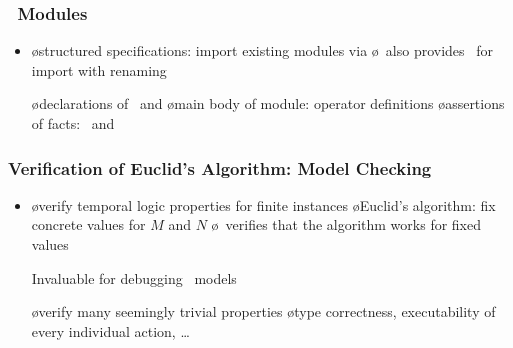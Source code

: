 \documentclass[fleqn]{beamer}
\begin{document}
\begin{frame}
  \frametitle{\tlaplus\ Modules}

  \begin{itemize}
  \item {}

    \begin{itemize}
    \o structured specifications: import existing modules via \EXTENDS
    \o \tlaplus\ also provides \INSTANCE\ for import with renaming
    \end{itemize}

  \oo {}

    \begin{itemize}
    \o declarations of \CONSTANTS\ and \VARIABLES
    \o main body of module: operator definitions
    \o assertions of facts: \ASSUME\ and \THEOREM
    \end{itemize}

  \oo {}

    \medskip

    \renewcommand{\arraystretch}{1.2}
  \end{itemize}
\end{frame}

\begin{frame}
  \frametitle{Verification of Euclid's Algorithm: Model Checking}

  \begin{itemize}
  \item {}

    \begin{itemize}
    \o verify temporal logic properties for finite instances
    \o Euclid's algorithm: fix concrete values for $M$ and $N$
    \o \tlc\ verifies that the algorithm works for fixed values
    \end{itemize}

  \oo {}

  \oo \alert{Invaluable for debugging \tlaplus\ models}

    \begin{itemize}
    \o verify many seemingly trivial properties
    \o type correctness, executability of every individual action, \ldots
    \end{itemize}
  \end{itemize}

\vfill\vfill\vfill
\end{frame}
\end{document}
